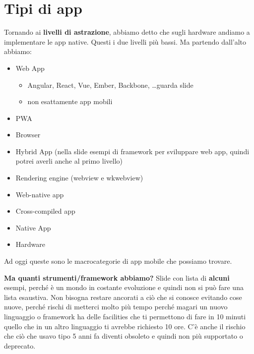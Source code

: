 \section{Tipi di app}
\par Tornando ai \textbf{livelli di astrazione}, abbiamo detto che sugli hardware andiamo a implementare le app native. Questi i due livelli più bassi. Ma partendo dall'alto abbiamo:
\begin{itemize}
    \item Web App
    \begin{itemize}
        \item Angular, React, Vue, Ember, Backbone, \dots guarda slide 
        \item non esattamente app mobili
    \end{itemize}
    \item PWA
    \item Browser
    \item Hybrid App (nella slide esempi di framework per sviluppare web app, quindi potrei averli anche al primo livello)
    \item Rendering engine (webview e wkwebview)
    \item Web-native app
    \item Cross-compiled app
    \item Native App
    \item Hardware
\end{itemize}
\par Ad oggi queste sono le macrocategorie di app mobile che possiamo trovare.
\par \textbf{Ma quanti strumenti/framework abbiamo?} Slide con lista di \textbf{alcuni} esempi, perché è un mondo in costante evoluzione e quindi non si può fare una lista esaustiva. Non bisogna restare ancorati a ciò che si conosce evitando cose nuove, perché rischi di metterci molto più tempo perché magari un nuovo linguaggio o framework ha delle facilities che ti permettono di fare in 10 minuti quello che in un altro linguaggio ti avrebbe richiesto 10 ore. C'è anche il rischio che ciò che usavo tipo 5 anni fa diventi obsoleto e quindi non più supportato o deprecato.

